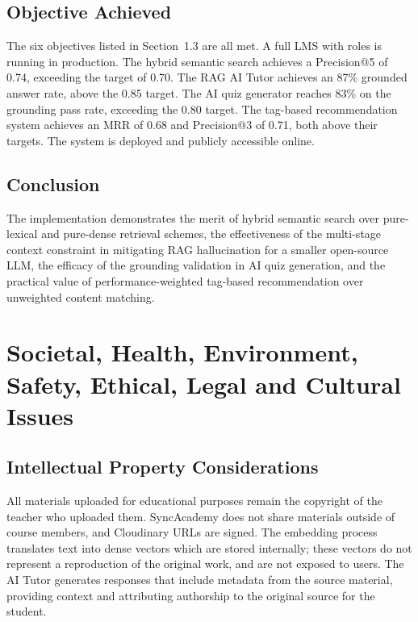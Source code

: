 \documentclass[12pt,a4paper]{report}
\begin{document}
\section{Objective Achieved}

The six objectives listed in Section~1.3 are all met. A full LMS with roles is running in production. The hybrid semantic search achieves a Precision@5 of 0.74, exceeding the target of 0.70. The RAG AI Tutor achieves an 87\% grounded answer rate, above the 0.85 target. The AI quiz generator reaches 83\% on the grounding pass rate, exceeding the 0.80 target. The tag-based recommendation system achieves an MRR of 0.68 and Precision@3 of 0.71, both above their targets. The system is deployed and publicly accessible online.

\section{Conclusion}

The implementation demonstrates the merit of hybrid semantic search over pure-lexical and pure-dense retrieval schemes, the effectiveness of the multi-stage context constraint in mitigating RAG hallucination for a smaller open-source LLM, the efficacy of the grounding validation in AI quiz generation, and the practical value of performance-weighted tag-based recommendation over unweighted content matching.

\chapter{Societal, Health, Environment, Safety, Ethical, Legal and Cultural Issues}

\section{Intellectual Property Considerations}

All materials uploaded for educational purposes remain the copyright of the teacher who uploaded them. SyncAcademy does not share materials outside of course members, and Cloudinary URLs are signed. The embedding process translates text into dense vectors which are stored internally; these vectors do not represent a reproduction of the original work, and are not exposed to users. The AI Tutor generates responses that include metadata from the source material, providing context and attributing authorship to the original source for the student.
\end{document}
